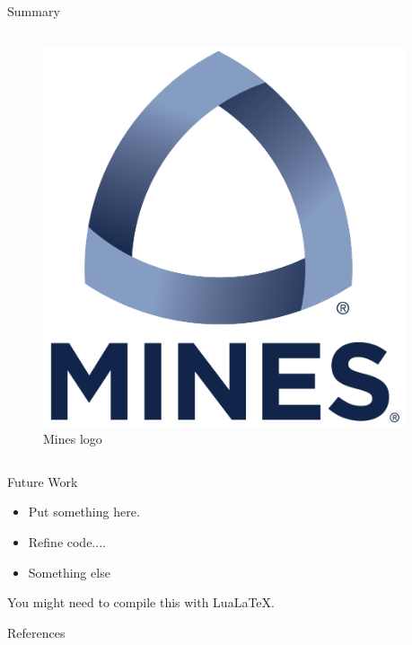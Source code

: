 \documentclass[final]{beamer}
\newlength{\sepwidth}
\newlength{\colwidth}
\newcommand{\separatorcolumn}{\begin{column}{\sepwidth}\end{column}}
\begin{document}
\begin{frame}[t]
\begin{columns}[t]
\begin{column}{\colwidth}
\begin{block}{Summary}
\begin{columns}
	\begin{column}{0.25\textwidth}
	\begin{figure}[h]
	\centering
	\includegraphics[width=\linewidth]{Images/MinesLogo_WhiteBkg.png}
	\caption{Mines logo}
	\label{fig:Mines}
\end{figure} 
	\end{column}
\end{columns}

\end{block}

\begin{block}{Future Work}
\begin{itemize}
	\item[\textcolor{blasterBlue}{\bullet}] Put something here.
	\item[\textcolor{blasterBlue}{\bullet}] Refine code.... 
	\item[\textcolor{blasterBlue}{\bullet}] Something else
\end{itemize}
You might need to compile this with LuaLaTeX. 
\end{block}

\begin{block}{References}
\footnotesize{}
\end{block}
\end{column}

\separatorcolumn
\end{columns}

\end{frame}
\end{document}
